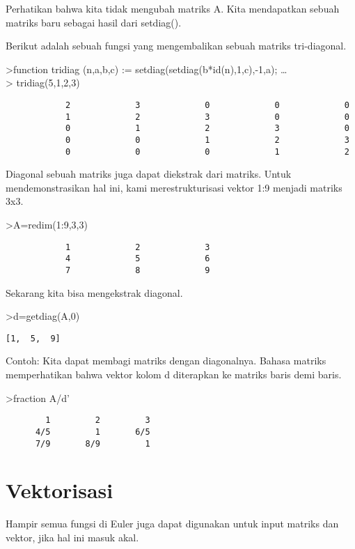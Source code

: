 \documentclass[
]{book}
\begin{document}
Perhatikan bahwa kita tidak mengubah matriks A. Kita mendapatkan sebuah matriks baru sebagai hasil dari setdiag().

Berikut adalah sebuah fungsi yang mengembalikan sebuah matriks tri-diagonal.

\textgreater function tridiag (n,a,b,c) := setdiag(setdiag(b*id(n),1,c),-1,a); \ldots{}\\
\textgreater{} tridiag(5,1,2,3)

\begin{verbatim}
            2             3             0             0             0 
            1             2             3             0             0 
            0             1             2             3             0 
            0             0             1             2             3 
            0             0             0             1             2 
\end{verbatim}

Diagonal sebuah matriks juga dapat diekstrak dari matriks. Untuk mendemonstrasikan hal ini, kami merestrukturisasi vektor 1:9 menjadi matriks 3x3.

\textgreater A=redim(1:9,3,3)

\begin{verbatim}
            1             2             3 
            4             5             6 
            7             8             9 
\end{verbatim}

Sekarang kita bisa mengekstrak diagonal.

\textgreater d=getdiag(A,0)

\begin{verbatim}
[1,  5,  9]
\end{verbatim}

Contoh: Kita dapat membagi matriks dengan diagonalnya. Bahasa matriks memperhatikan bahwa vektor kolom d diterapkan ke matriks baris demi baris.

\textgreater fraction A/d'

\begin{verbatim}
        1         2         3 
      4/5         1       6/5 
      7/9       8/9         1 
\end{verbatim}

\chapter{Vektorisasi}\label{vektorisasi}

Hampir semua fungsi di Euler juga dapat digunakan untuk input matriks dan vektor, jika hal ini masuk akal.
\end{document}
